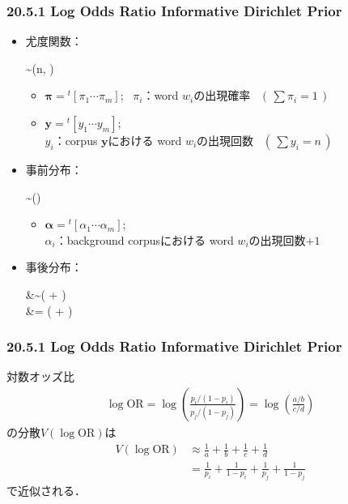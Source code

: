 
\begin{frame}[noframenumbering]
    \frametitle{20.5.1 Log Odds Ratio Informative Dirichlet Prior}
    \begin{itemize}
        \item 尤度関数：
        \begin{yalign*}
             \sim {}(n, \bm{\pi})
        \end{yalign*}
        \begin{itemize}
            \item $\bm{\pi} = {}^t[\pi_1 \cdots \pi_m]$; \ $\pi_i$：word $w_i$の出現確率 \ $(\, \sum \pi_i = 1 \,)$
            \item $\bm{y} = {}^t[y_1 \cdots y_m]$; \\
                $y_i$：corpus $\bm{y}$における word $w_i$の出現回数 \ $(\, \sum y_i = n \,)$
        \end{itemize}
    \end{itemize}
    \begin{itemize}
        \item 事前分布：
        \begin{yalign*}
            \bm{\pi} \sim {}(\bm{\alpha})
        \end{yalign*}
        \begin{itemize}
            \item $\bm{\alpha} = {}^t[\alpha_1 \cdots \alpha_m]$; \\
                $\alpha_i$：background corpusにおける word $w_i$の出現回数$+1$
        \end{itemize}
    \end{itemize}
    \begin{itemize}
        \item 事後分布：
        \begin{yalign*}
            \hat{\bm{\pi}} &\sim {}( + \bm{\alpha}) \\
            \therefore \hat{\bm{\pi}} &= ( + \bm{\alpha})
        \end{yalign*}
    \end{itemize}
\end{frame}


\begin{frame}[noframenumbering]
    \frametitle{20.5.1 Log Odds Ratio Informative Dirichlet Prior}
    対数オッズ比
    \begin{align*}
        \log{\mathrm{OR}} = \log\left(\frac{p_{i} / (1 - p_{i})}{p_{j} / (1 - p_{j})}\right) = \log\left(\frac{a/b}{c/d}\right)
    \end{align*}
    の分散$V(\log{\mathrm{OR}})$は
    \begin{align*}
        V(\log{\mathrm{OR}}) &\approx \frac{1}{a} + \frac{1}{b} + \frac{1}{c} + \frac{1}{d} \\
        &= \frac{1}{p_{i}} + \frac{1}{1-p_{i}} + \frac{1}{p_{j}} + \frac{1}{1-p_{j}}
    \end{align*}
    で近似される．
\end{frame}
